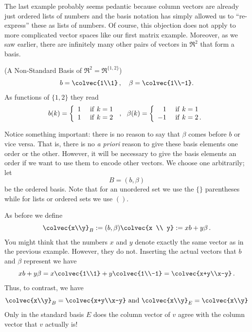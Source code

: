 The last example probably seems pedantic because column vectors are already just ordered lists of numbers and the basis notation 
has simply allowed us to ``re-express'' these as lists of numbers. Of course, this objection does not apply to more complicated vector spaces like our first matrix example. Moreover, as we saw \hypertarget{nonstandard r2 basis}{earlier}, there are infinitely many other pairs of vectors in $\Re^2$ that form a basis.

\begin{example}(A Non-Standard Basis of $\Re^2=\Re^{\{1,2\}}$)\\
$$
b=\colvec{1\\1}\, ,\quad \beta=\colvec{1\\-1}.
$$
As functions of $\{1,2\}$ they read
\begin{displaymath}
   b (k)= \left\{
     \begin{array}{lr}
       1 & {\rm ~if~} k=1\\
       1 & {\rm ~if~} k=2
     \end{array}
   \right. \, ,~~
   \beta (k)= \left\{
     \begin{array}{rl}
       1 & {\rm ~if~} k=1\\
       -1 & {\rm ~if~} k=2\, .
     \end{array}
   \right.
\end{displaymath} 

Notice something important: there is no reason to say that $\beta$ comes before $b$ or vice versa. That is, there is no {\it a priori} reason to give these basis elements one order or the other. 
However, it will be necessary to give the basis elements an order if we want to use them to encode other vectors.  We choose one arbitrarily; let $$B=(b,\beta)$$ be the ordered basis. Note that for an unordered set we use the $\{\}$ parentheses while for lists or ordered sets we use $()$. 

As before we define 
$$
\colvec{x\\y}_B :=(b,\beta)\colvec{x \\ y}:= xb+ y \beta\, . 
$$
You might think that the numbers $x$ and $y$ denote exactly the same vector as in the previous example. However, they do not. Inserting
the actual vectors that $b$ and $\beta$ represent we have
$$
xb+ y \beta=x\colvec{1\\1}+y\colvec{1\\-1}=\colvec{x+y\\x-y}\, .
$$
Thus, to contrast, we have
$$
\colvec{x\\y}_B=\colvec{x+y\\x-y} \mbox{ and } \colvec{x\\y}_E=\colvec{x\\y}
$$
Only in the standard basis $E$ does the column vector of $v$ agree with the column vector that $v$ actually is!


\end{example}
